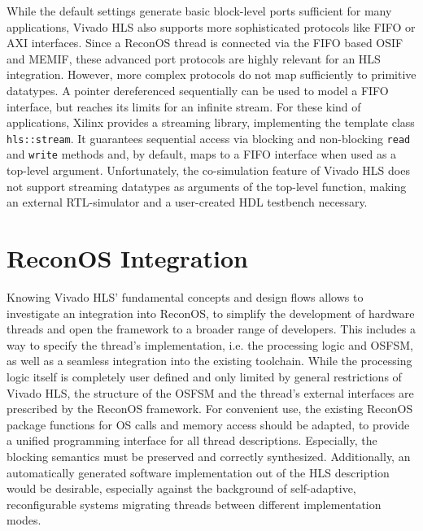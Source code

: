 While the default settings generate basic block-level ports sufficient for
many applications, Vivado HLS also supports more sophisticated protocols like
\ac{FIFO} or \ac{AXI} interfaces. Since a ReconOS thread is connected via
the \ac{FIFO} based \ac{OSIF} and \ac{MEMIF}, these advanced port protocols
are highly relevant for an \ac{HLS} integration. However, more complex
protocols do not map sufficiently to primitive datatypes. A pointer
dereferenced sequentially can be used to model a \ac{FIFO} interface, but
reaches its limits for an infinite stream. For these kind of applications,
Xilinx provides a streaming library, implementing the template class
\lstinline{hls::stream}. It guarantees sequential access via blocking and
non-blocking \lstinline{read} and \lstinline{write} methods and, by default,
maps to a \ac{FIFO} interface when used as a top-level argument.
Unfortunately, the co-simulation feature of Vivado HLS does not support
streaming datatypes as arguments of the top-level function, making an external
\ac{RTL}-simulator and a user-created \ac{HDL} testbench necessary.

\section{ReconOS Integration}
Knowing Vivado HLS' fundamental concepts and design flows allows to
investigate an integration into ReconOS, to simplify the development of
hardware threads and open the framework to a broader range of developers. This
includes a way to specify the thread's implementation, i.e. the processing
logic and \ac{OSFSM}, as well as a seamless integration into the existing
toolchain. While the processing logic itself is completely user defined and
only limited by general restrictions of Vivado HLS, the structure of the
\ac{OSFSM} and the thread's external interfaces are prescribed by the ReconOS
framework. For convenient use, the existing ReconOS package functions for
\ac{OS} calls and memory access should be adapted, to provide a unified
programming interface for all thread descriptions. Especially, the blocking
semantics must be preserved and correctly synthesized. Additionally, an
automatically generated software implementation out of the \ac{HLS}
description would be desirable, especially against the background of
self-adaptive, reconfigurable systems migrating threads between different
implementation modes.

